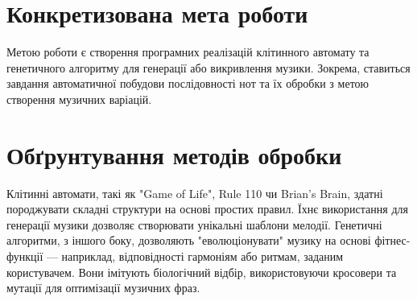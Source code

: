 \documentclass{article}
\begin{document}
    \section{Конкретизована мета роботи}
    Метою роботи є створення програмних реалізацій клітинного автомату та генетичного алгоритму для генерації або викривлення музики. Зокрема, ставиться завдання автоматичної побудови послідовності нот та їх обробки з метою створення музичних варіацій.

    \section{Обґрунтування методів обробки}
    Клітинні автомати, такі як "Game of Life", Rule 110 чи Brian's Brain, здатні породжувати складні структури на основі простих правил. Їхнє використання для генерації музики дозволяє створювати унікальні шаблони мелодії.  
    Генетичні алгоритми, з іншого боку, дозволяють "еволюціонувати" музику на основі фітнес-функції — наприклад, відповідності гармоніям або ритмам, заданим користувачем. Вони імітують біологічний відбір, використовуючи кросовери та мутації для оптимізації музичних фраз.
\end{document}
